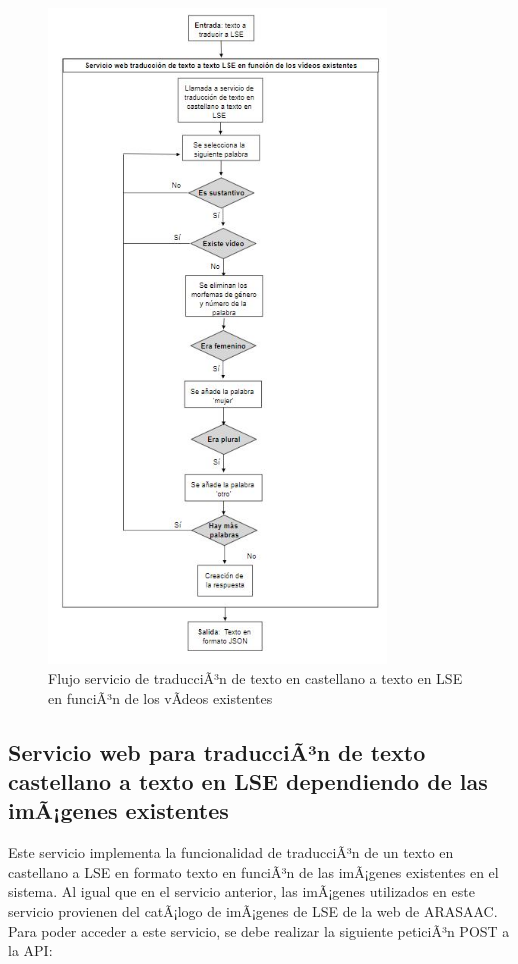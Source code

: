 \begin{figure}[]
	\centering
	\includegraphics[width=0.8\textwidth]{Imagenes/Fuentes/Text2LSE/FlujoTextoVideoTexto.jpg}
	\caption{ Flujo servicio de traducciÃ³n de texto en castellano a texto en LSE en funciÃ³n de los vÃ­deos existentes }
	\label {fig: imgFlujoTextoVideoTextoText2LSE}
\end{figure}

\subsection{Servicio web para traducciÃ³n de texto castellano a texto en LSE dependiendo de las imÃ¡genes existentes}

Este servicio implementa la funcionalidad de traducciÃ³n de un texto en castellano a LSE en formato texto en funciÃ³n de las imÃ¡genes existentes en el sistema. Al igual que en el servicio anterior, las imÃ¡genes utilizados en este servicio provienen del catÃ¡logo de imÃ¡genes de LSE de la web de ARASAAC. Para poder acceder a este servicio, se debe realizar la siguiente peticiÃ³n POST a la API:\\

